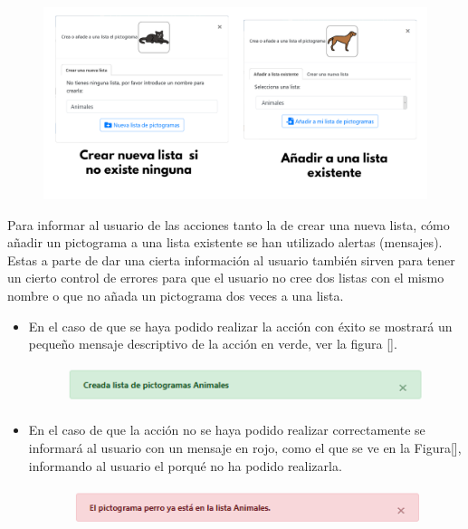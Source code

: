\begin{figure}[h!]
	\centering
	\includegraphics[width=0.7\linewidth]{Imagenes/Bitmap/modalesColeccion}
	\caption{}
	\label{fig:modalescoleccion}
\end{figure}


Para informar al usuario de las acciones tanto la de crear una nueva lista, cómo añadir un pictograma a una lista existente se han utilizado alertas (mensajes). Estas a parte de dar una cierta información al usuario también sirven para tener un cierto control de errores para que el usuario no cree dos listas con el mismo nombre o que no añada un pictograma dos veces a una lista.


\begin{itemize}
	\item En el caso de que se haya podido realizar la acción con éxito se mostrará un pequeño mensaje descriptivo de la acción en verde, ver la figura [].
	
	\begin{figure}[h!]
		\centering
		\includegraphics[width=0.7\linewidth]{Imagenes/Bitmap/alertListaPicto}
		\caption{}
		\label{fig:alertlistapicto}
	\end{figure}
	
	
	\item  En el caso de que la acción no se haya podido realizar correctamente se informará al usuario con un mensaje en rojo, como el que se ve en la Figura[], informando al usuario el porqué no ha podido realizarla.
	
	\begin{figure}[h!]
		\centering
		\includegraphics[width=0.7\linewidth]{Imagenes/Bitmap/alertErrorListaPicto}
		\caption{}
		\label{fig:alerterrorlistapicto}
	\end{figure}
	
	
	
\end{itemize}

